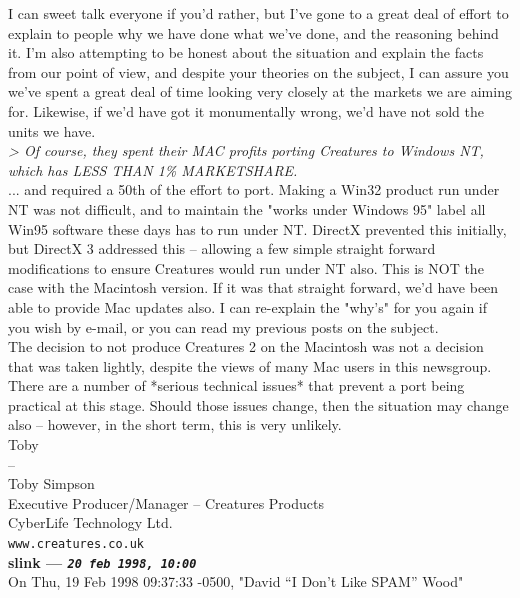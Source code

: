 \documentclass[11pt,twoside,a4paper]{article}
\begin{document}
\begin{multicols*}{2}
I can sweet talk everyone if you'd rather, but I've gone to a great deal of effort to explain to people why we have done what we've done, and the reasoning behind it. I'm also attempting to be honest about the situation and explain the facts from our point of view, and despite your theories on the subject, I can assure you we've spent a great deal of time looking very closely at the markets we are aiming for. Likewise, if we'd have got it monumentally wrong, we'd have not sold the units we have.~\\

\emph{> Of course, they spent their MAC profits porting Creatures to Windows NT, which has LESS THAN 1\% MARKETSHARE.}~\\

... and required a 50th of the effort to port. Making a Win32 product run under NT was not difficult, and to maintain the "works under Windows 95" label all Win95 software these days has to run under NT. DirectX prevented this initially, but DirectX 3 addressed this -- allowing a few simple straight forward modifications to ensure Creatures would run under NT also. This is NOT the case with the Macintosh version. If it was that straight forward, we'd have been able to provide Mac updates also. I can re-explain the "why's" for you again if you wish by e-mail, or you can read my previous posts on the subject.~\\

The decision to not produce Creatures 2 on the Macintosh was not a decision that was taken lightly, despite the views of many Mac users in this newsgroup. There are a number of *serious technical issues* that prevent a port being practical at this stage. Should those issues change, then the situation may change also -- however, in the short term, this is very unlikely.~\\

Toby~\\
-- ~\\
Toby Simpson~\\
Executive Producer/Manager -- Creatures Products~\\
CyberLife Technology Ltd.~\\
\texttt{www.creatures.co.uk}~\\

 
		
	
		
\textbf{slink --- \emph{\texttt{20 feb 1998, 10:00}}}~\\

On Thu, 19 Feb 1998 09:37:33 -0500, "David ``I Don't Like SPAM'' Wood"


\end{multicols*}
\end{document}
